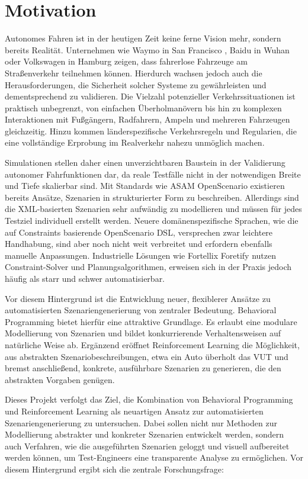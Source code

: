 \chapter{Motivation}
\label{chap:motivation}
Autonomes Fahren ist in der heutigen Zeit keine ferne Vision mehr, sondern bereits Realität. Unternehmen wie Waymo in San Francisco \cite{WaymoRobotaxis2025}, Baidu in Wuhan \cite{BaiduRobotaxi2024} oder Volkswagen in Hamburg \cite{VolkswagenRobotaxis2025} zeigen, dass fahrerlose Fahrzeuge am Straßenverkehr teilnehmen können. Hierdurch wachsen jedoch auch die Herausforderungen, die Sicherheit solcher Systeme zu gewährleisten und dementsprechend zu validieren. Die Vielzahl potenzieller Verkehrssituationen ist praktisch unbegrenzt, von einfachen Überholmanövern bis hin zu komplexen Interaktionen mit Fußgängern, Radfahrern, Ampeln und mehreren Fahrzeugen gleichzeitig. Hinzu kommen länderspezifische Verkehrsregeln und Regularien, die eine vollständige Erprobung im Realverkehr nahezu unmöglich machen.

Simulationen stellen daher einen unverzichtbaren Baustein in der Validierung autonomer Fahrfunktionen dar, da reale Testfälle nicht in der notwendigen Breite und Tiefe skalierbar sind. Mit Standards wie ASAM OpenScenario existieren bereits Ansätze, Szenarien in strukturierter Form zu beschreiben. Allerdings sind die XML-basierten Szenarien sehr aufwändig zu modellieren und müssen für jedes Testziel individuell erstellt werden. Neuere domänenspezifische Sprachen, wie die auf Constraints basierende OpenScenario DSL, versprechen zwar leichtere Handhabung, sind aber noch nicht weit verbreitet und erfordern ebenfalls manuelle Anpassungen. Industrielle Lösungen wie Fortellix Foretify nutzen Constraint-Solver und Planungsalgorithmen, erweisen sich in der Praxis jedoch häufig als starr und schwer automatisierbar.

Vor diesem Hintergrund ist die Entwicklung neuer, flexiblerer Ansätze zu automatisierten Szenariengenerierung von zentraler Bedeutung. Behavioral Programming bietet hierfür eine attraktive Grundlage. Es erlaubt eine modulare Modellierung von Szenarien und bildet konkurrierende Verhaltensweisen auf natürliche Weise ab. Ergänzend eröffnet Reinforcement Learning die Möglichkeit, aus abstrakten Szenariobeschreibungen, etwa ein Auto überholt das VUT und bremst anschließend, konkrete, ausführbare Szenarien zu generieren, die den abstrakten Vorgaben genügen.

Dieses Projekt verfolgt das Ziel, die Kombination von Behavioral Programming und Reinforcement Learning als neuartigen Ansatz zur automatisierten Szenariengenerierung zu untersuchen. Dabei sollen nicht nur Methoden zur Modellierung abstrakter und konkreter Szenarien entwickelt werden, sondern auch Verfahren, wie die ausgeführten Szenarien geloggt und visuell aufbereitet werden können, um Test-Engineers eine transparente Analyse zu ermöglichen. Vor diesem Hintergrund ergibt sich die zentrale Forschungsfrage: 

